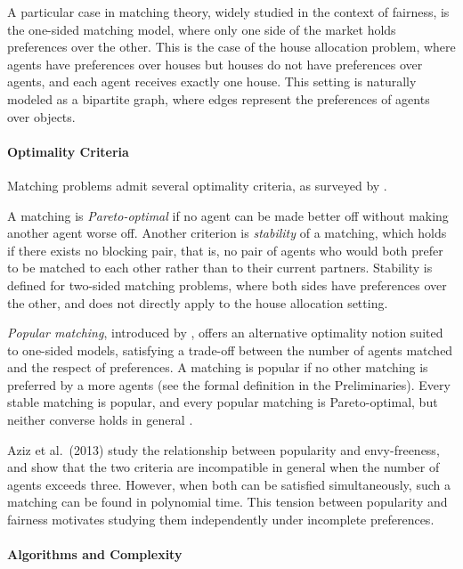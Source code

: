 \documentclass{article}
\begin{document}
A particular case in matching theory, widely studied in the context of fairness, is the one-sided matching model, where only one side of the market holds preferences over the other. 
This is the case of the house allocation problem, where agents have preferences over houses but houses do not have preferences over agents, and each agent receives exactly one house. 
This setting is naturally modeled as a bipartite graph, where edges represent the preferences of agents over objects.

\paragraph{Optimality Criteria}

Matching problems admit several optimality criteria, as surveyed by \cite{cseh2017popular}.

A matching is \emph{Pareto-optimal} if no agent can be made better off without making another agent worse off. 
Another criterion is \emph{stability} of a matching, which holds if there exists no blocking pair, that is, no pair of agents who would both prefer to be matched to each other rather than to their current partners. 
Stability is defined for two-sided matching problems, where both sides have preferences over the other, and does not directly apply to the house allocation setting.

\emph{Popular matching}, introduced by \cite{gardenfors1975match}, offers an alternative optimality notion suited to one-sided models, satisfying a trade-off between the number of agents matched and the respect of preferences.
A matching is popular if no other matching is preferred by a more agents (see the formal definition in the Preliminaries). 
Every stable matching is popular, and every popular matching is Pareto-optimal, but neither converse holds in general \citep{cseh2017popular}.

Aziz et al.~(2013) study the relationship between popularity and envy-freeness, and show that the two criteria are incompatible in general when the number of agents exceeds three. 
However, when both can be satisfied simultaneously, such a matching can be found in polynomial time. 
This tension between popularity and fairness motivates studying them independently under incomplete preferences.

\paragraph{Algorithms and Complexity}
\end{document}
